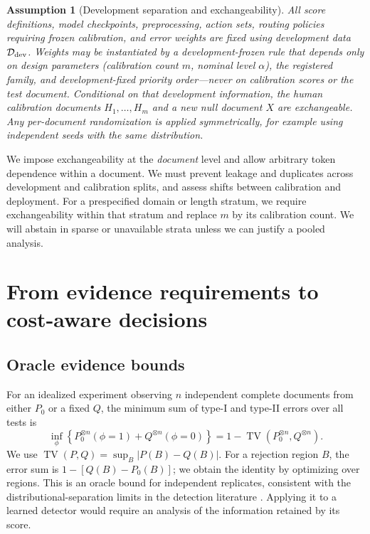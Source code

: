 \documentclass[pdflatex,sn-mathphys-num]{sn-jnl}
\newtheorem{assumption}{Assumption}
\newcommand{\TV}{\operatorname{TV}}
\newcommand{\calD}{\mathcal{D}}
\begin{document}
\begin{assumption}[Development separation and exchangeability]\label{ass:exchange}
All score definitions, model checkpoints, preprocessing, action sets, routing policies requiring frozen calibration, and error weights are fixed using development data \(\calD_{\rm dev}\). Weights may be instantiated by a development-frozen rule that depends only on design parameters (calibration count \(m\), nominal level \(\alpha\)), the registered family, and development-fixed priority order---never on calibration scores or the test document. Conditional on that development information, the human calibration documents \(H_1,\ldots,H_m\) and a new null document \(X\) are exchangeable. Any per-document randomization is applied symmetrically, for example using independent seeds with the same distribution.
\end{assumption}

We impose exchangeability at the \emph{document} level and allow arbitrary token dependence within a document. We must prevent leakage and duplicates across development and calibration splits, and assess shifts between calibration and deployment. For a prespecified domain or length stratum, we require exchangeability within that stratum and replace \(m\) by its calibration count. We will abstain in sparse or unavailable strata unless we can justify a pooled analysis.

\section{From evidence requirements to cost-aware decisions}\label{sec:complexity}

\subsection{Oracle evidence bounds}

For an idealized experiment observing \(n\) independent complete documents from either \(P_0\) or a fixed \(Q\), the minimum sum of type-I and type-II errors over all tests is
\begin{equation}
 \inf_{\phi}\left\{P_0^{\otimes n}(\phi=1)
       +Q^{\otimes n}(\phi=0)\right\}
 =1-\TV(P_0^{\otimes n},Q^{\otimes n}).
 \label{eq:tv}
\end{equation}
We use \(\TV(P,Q)=\sup_B|P(B)-Q(B)|\). For a rejection region \(B\), the error sum is \(1-[Q(B)-P_0(B)]\); we obtain the identity by optimizing over regions. This is an oracle bound for independent replicates, consistent with the distributional-separation limits in the detection literature \citep{chakraborty2024,sadasivan2025}. Applying it to a learned detector would require an analysis of the information retained by its score.
\end{document}
